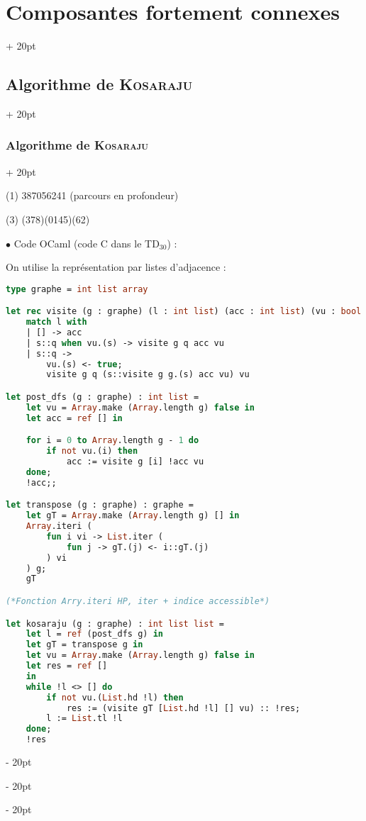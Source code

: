 \documentclass[a4paper, 12pt, twoside]{article}
\newcommand{\ind}[1][20pt]{\advance\leftskip + #1}
\newcommand{\deind}[1][20pt]{\advance\leftskip - #1}
\newenvironment{indt}[2][20pt]{#2 \par \ind[#1]}{\par \deind} %
\begin{document}
\begin{indt}{\section{Composantes fortement connexes}}
\begin{indt}{\subsection{Algorithme de \textsc{Kosaraju}}}
\begin{indt}{\subsubsection{Algorithme de \textsc{Kosaraju}}}
\begin{center}
                \end{center}

                (1) 387056241 (parcours en profondeur)

                (3) (378)(0145)(62)

                \vspace{12pt}
                
                $\bullet$ Code OCaml (code C dans le TD$_{30}$) :

                On utilise la représentation par listes d'adjacence :

                \newpage

                \begin{lstlisting}[language=Caml, xleftmargin=80pt]
type graphe = int list array

let rec visite (g : graphe) (l : int list) (acc : int list) (vu : bool array) : int list =
    match l with
    | [] -> acc
    | s::q when vu.(s) -> visite g q acc vu
    | s::q ->
        vu.(s) <- true;
        visite g q (s::visite g g.(s) acc vu) vu

let post_dfs (g : graphe) : int list =
    let vu = Array.make (Array.length g) false in
    let acc = ref [] in

    for i = 0 to Array.length g - 1 do
        if not vu.(i) then
            acc := visite g [i] !acc vu
    done;
    !acc;;

let transpose (g : graphe) : graphe =
    let gT = Array.make (Array.length g) [] in
    Array.iteri (
        fun i vi -> List.iter (
            fun j -> gT.(j) <- i::gT.(j)
        ) vi
    ) g;
    gT

(*Fonction Arry.iteri HP, iter + indice accessible*)

let kosaraju (g : graphe) : int list list =
    let l = ref (post_dfs g) in
    let gT = transpose g in
    let vu = Array.make (Array.length g) false in
    let res = ref []
    in
    while !l <> [] do
        if not vu.(List.hd !l) then
            res := (visite gT [List.hd !l] [] vu) :: !res;
        l := List.tl !l
    done;
    !res
                \end{lstlisting}


\end{indt}
\end{indt}
\end{indt}
\end{document}
